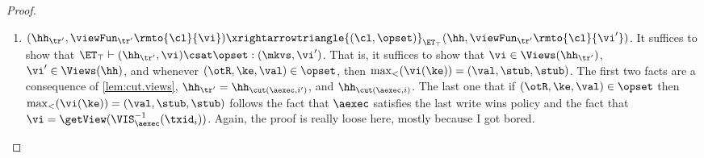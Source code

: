 \begin{proof}
\begin{itemize}
\begin{enumerate}
\begin{itemize}
\item There exists an index $j : 1 \leq j \leq i'$ and an integer $h \in \Nat$ such that $\txid_{j} = \txid_{\cl}^{h}$. 
Without loss of generality, let $j$ be the largest such index. 
It follows that the last transition in $\tr'$ of the form $(\stub, \stub) \xrightarrow{(\cl, \opset_{j})} (\stub, \viewFun_{\mathsf{pre}})$ 
is such that $\viewFun_{\mathsf{pre}}(\cl) = \getView(\aexec, \T_{\mathsf{pre}})$, 
for some $\T_{\mathsf{pre}} \subseteq \VIS^{-1}_{\aexec}(\txid_{i}) \cap (\AR^{-1}_{\aexec})?(\txid_{j})$.
This is because $\nextTx(\cl, \aexec, j)$  is defined and equal to $\txid_{i}$. 
Furthermore, because the trace $\tr'$ is in normal form by construction, 
in $\tr'$ a transition of the form $(\stub, \stub) \xrightarrowtriangle{(\cl, \varepsilon)}_{\ET_{\top}} (\stub, \stub)$ 
is always followed by a transition of the form $(\stub, \stub) \xrightarrowtriangle{(\cl, \opset')}_{\ET_{\top}} (\stub, \stub)$. 
Because we assume that the last transition where client $\cl$ executes a transaction in $\tr'$ 
has the form $(\stub, \stub) \xrightarrowtriangle{(\cl, \opset_{j})}_{\ET_{\top}} (\stub, \viewFun_{\mathsf{pre}})$, 
then the latter is also the last transition for client $\cl$ in $\tr'$ 
(i.e. including both execution of transactions and view updates). 
It follows that $\viewFun_{\tr'}(\cl) = \viewFun_{\mathsf{pre}}(\cl)$, and in particular 
$\viewFun_{\tr'}(\cl) = \getView(\aexec, \T_{\mathsf{pre}})$. By definition, 
$\T_{\mathsf{pre}} \subseteq  \VIS^{-1}_{\aexec}(\txid_{i}) \cap (\AR^{-1}_{\aexec})?(\txid_{j}) 
\subseteq \VIS^{-1}_{\aexec}(\txid_{i})$. By  \cref{lem:getView.monotone}, 
we have that $\viewFun_{\tr'}(\cl) = \getView(\aexec, \T_{\mathsf{pre}}) \viewleq 
\getView(\aexec, \VIS^{-1}_{\aexec}(\txid_{i})) = \vi$, as we wanted to prove.
\ac{Note: this is more a sketch, rather than a real proof. A Proposition giving an explicit form to the 
structure of any $\tr \in \KVtrace(\ET_{\top}, \aexec)$ would be helpful for a more rigorous proof here.}
\end{itemize}


\item $(\hh_{\tr'}, \viewFun_{\tr'}\rmto{\cl}{\vi}) \xrightarrowtriangle{(\cl, \opset)}_{\ET_{\top}} (\hh,  \viewFun_{\tr'}\rmto{\cl}{\vi'})$. 
    It suffices to show that $\ET_{\top} \vdash (\hh_{\tr'}, \vi) \csat \opset: (\mkvs,\vi')$. 
That is, it suffices to show that $\vi \in \Views(\hh_{\tr'})$, $\vi' \in \Views(\hh)$, 
and whenever $(\otR, \ke, \val) \in \opset$, then $\max_{<}(\vi(\ke)) = (\val, \stub, \stub)$. 
The first two facts are a consequence of \cref{lem:cut.views}, $\hh_{\tr'} = \hh_{\cut(\aexec, i')}$, and  $\hh_{\cut(\aexec, i)}$. 
The last one that if $(\otR, \ke, \val) \in \opset$ then $\max_{<}(\vi(\ke)) = (\val, \stub, \stub)$ follows the fact that 
$\aexec$ satisfies the last write wins policy and the fact that $\vi = \getView(\VIS^{-1}_{\aexec}(\txid_{i}))$.
\ac{Again, the proof is really loose here, mostly because I got bored.}
\end{enumerate} 

\end{itemize}
\end{proof}

